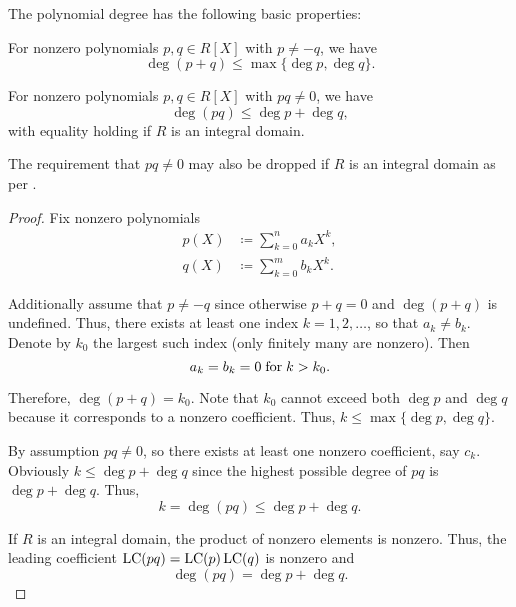 \begin{proposition}\label{thm:def:polynomial_degree/properties}
  The polynomial degree has the following basic properties:
  \begin{thmenum}
     For nonzero polynomials \( p, q \in R[X] \) with \( p \neq -q \), we have
    \begin{equation*}
      \deg (p + q) \leq \max \{ \deg p, \deg q \}.
    \end{equation*}

     For nonzero polynomials \( p, q \in R[X] \) with \( pq \neq 0 \), we have
    \begin{equation*}
      \deg (pq) \leq \deg p + \deg q,
    \end{equation*}
    with equality holding if \( R \) is an integral domain.

    The requirement that \( pq \neq 0 \) may also be dropped if \( R \) is an integral domain as per .
  \end{thmenum}
\end{proposition}
\begin{proof}
  Fix nonzero polynomials
  \begin{align}
    p(X) &\coloneqq \sum_{k=0}^n a_k X^k, \label{eq:thm:def:polynomial_degree/properties/p} \\
    q(X) &\coloneqq \sum_{k=0}^m b_k X^k. \label{eq:thm:def:polynomial_degree/properties/q}
  \end{align}

   Additionally assume that \( p \neq -q \) since otherwise \( p + q = 0 \) and \( \deg(p + q) \) is undefined. Thus, there exists at least one index \( k = 1, 2, \ldots \), so that \( a_k \neq b_k \). Denote by \( k_0 \) the largest such index (only finitely many are nonzero). Then
  \begin{equation*}
    a_k = b_k = 0 \T{for} k > k_0.
  \end{equation*}

  Therefore, \( \deg(p + q) = k_0 \). Note that \( k_0 \) cannot exceed both \( \deg p \) and \( \deg q \) because it corresponds to a nonzero coefficient. Thus, \( k \leq \max\{ \deg p, \deg q \} \).

   By assumption \( pq \neq 0 \), so there exists at least one nonzero coefficient, say \( c_k \). Obviously \( k \leq \deg p + \deg q \) since the highest possible degree of \( pq \) is \( \deg p + \deg q \). Thus,
  \begin{equation*}
    k = \deg (pq) \leq \deg p + \deg q.
  \end{equation*}

  If \( R \) is an integral domain, the product of nonzero elements is nonzero. Thus, the leading coefficient \( \operatorname{LC}(pq) = \operatorname{LC}(p)\operatorname{LC}(q) \) is nonzero and
  \begin{equation*}
    \deg(pq) = \deg p + \deg q.
  \end{equation*}
\end{proof}

